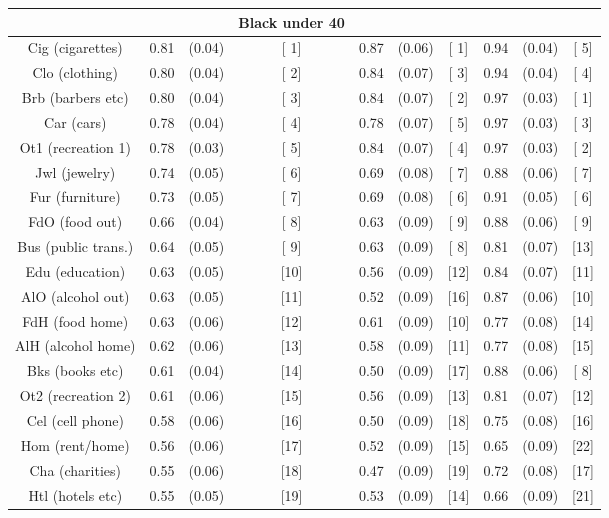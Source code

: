 \documentclass[a4paper,10pt]{article}
\title{}
\author{}
\date{}
\begin{document}
\begin{tabular}{cccccccccc}
\hline \hline
 & & & \textbf{Black under 40} & & & & & \\
\hline
Cig (cigarettes)&0.81&(0.04)&[ 1] & 0.87&(0.06)&[ 1] & 0.94 & (0.04) & [ 5] \\
Clo (clothing)&0.80&(0.04)&[ 2] & 0.84&(0.07)&[ 3] & 0.94 & (0.04) & [ 4] \\
Brb (barbers etc)&0.80&(0.04)&[ 3] & 0.84&(0.07)&[ 2] & 0.97 & (0.03) & [ 1] \\
Car (cars)&0.78&(0.04)&[ 4] & 0.78&(0.07)&[ 5] & 0.97 & (0.03) & [ 3] \\
Ot1 (recreation 1)&0.78&(0.03)&[ 5] & 0.84&(0.07)&[ 4] & 0.97 & (0.03) & [ 2] \\
Jwl (jewelry)&0.74&(0.05)&[ 6] & 0.69&(0.08)&[ 7] & 0.88 & (0.06) & [ 7] \\
Fur (furniture)&0.73&(0.05)&[ 7] & 0.69&(0.08)&[ 6] & 0.91 & (0.05) & [ 6] \\
FdO (food out)&0.66&(0.04)&[ 8] & 0.63&(0.09)&[ 9] & 0.88 & (0.06) & [ 9] \\
Bus (public trans.)&0.64&(0.05)&[ 9] & 0.63&(0.09)&[ 8] & 0.81 & (0.07) & [13] \\
Edu (education)&0.63&(0.05)&[10] & 0.56&(0.09)&[12] & 0.84 & (0.07) & [11] \\
AlO (alcohol out)&0.63&(0.05)&[11] & 0.52&(0.09)&[16] & 0.87 & (0.06) & [10] \\
FdH (food home)&0.63&(0.06)&[12] & 0.61&(0.09)&[10] & 0.77 & (0.08) & [14] \\
AlH (alcohol home)&0.62&(0.06)&[13] & 0.58&(0.09)&[11] & 0.77 & (0.08) & [15] \\
Bks (books etc)&0.61&(0.04)&[14] & 0.50&(0.09)&[17] & 0.88 & (0.06) & [ 8] \\
Ot2 (recreation 2)&0.61&(0.06)&[15] & 0.56&(0.09)&[13] & 0.81 & (0.07) & [12] \\
Cel (cell phone)&0.58&(0.06)&[16] & 0.50&(0.09)&[18] & 0.75 & (0.08) & [16] \\
Hom (rent/home)&0.56&(0.06)&[17] & 0.52&(0.09)&[15] & 0.65 & (0.09) & [22] \\
Cha (charities)&0.55&(0.06)&[18] & 0.47&(0.09)&[19] & 0.72 & (0.08) & [17] \\
Htl (hotels etc)&0.55&(0.05)&[19] & 0.53&(0.09)&[14] & 0.66 & (0.09) & [21] \\

\end{tabular}
\end{document}
